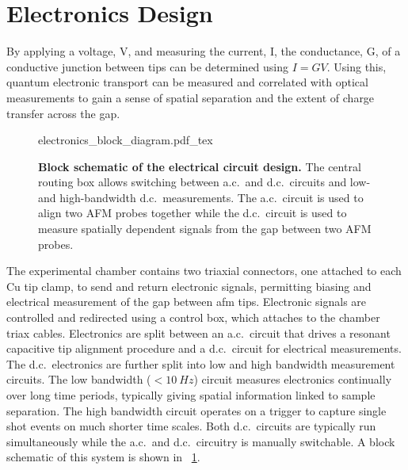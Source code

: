 \documentclass{article}
\begin{document}
\section{Electronics Design}
\label{sec:electronic_design}

By applying a voltage, \gls{V}, and measuring the current, \gls{I}, the conductance, \gls{G}, of a conductive junction between tips can be determined using $I=GV$. Using this, quantum electronic transport can be measured and correlated with optical measurements to gain a sense of spatial separation and the extent of charge transfer across the gap. %

\begin{figure}[bt]
\centering
\fontsize{10pt}{1em}\selectfont
{electronics_block_diagram.pdf_tex}
\caption[Block schematic of the electrical circuit design.]{\textbf{Block schematic of the electrical circuit design.} The central routing box allows switching between a.c.\ and d.c.\ circuits and low-and high-bandwidth d.c.\ measurements. The a.c.\ circuit is used to align two AFM probes together while the d.c.\ circuit is used to measure spatially dependent signals from the gap between two AFM probes.}
\label{fig:block_circuit_design}
\end{figure}

The experimental chamber contains two triaxial connectors, one attached to each Cu tip clamp, to send and return electronic signals, permitting biasing and electrical measurement of the gap between \gls{afm} tips. Electronic signals are controlled and redirected using a control box, which attaches to the chamber triax cables. Electronics are split between an a.c.\ circuit that drives a resonant capacitive tip alignment procedure and a d.c.\ circuit for electrical measurements. The d.c.\ electronics are further split into low and high bandwidth measurement circuits. The low bandwidth ($<\SI{10}{Hz}$) circuit measures electronics continually over long time periods, typically giving spatial information linked to sample separation. The high bandwidth circuit operates on a trigger to capture single shot events on much shorter time scales. Both d.c.\ circuits are typically run simultaneously while the a.c.\ and d.c.\ circuitry is manually switchable. A block schematic of this system is shown in \figurename~\ref{fig:block_circuit_design}.
\end{document}

